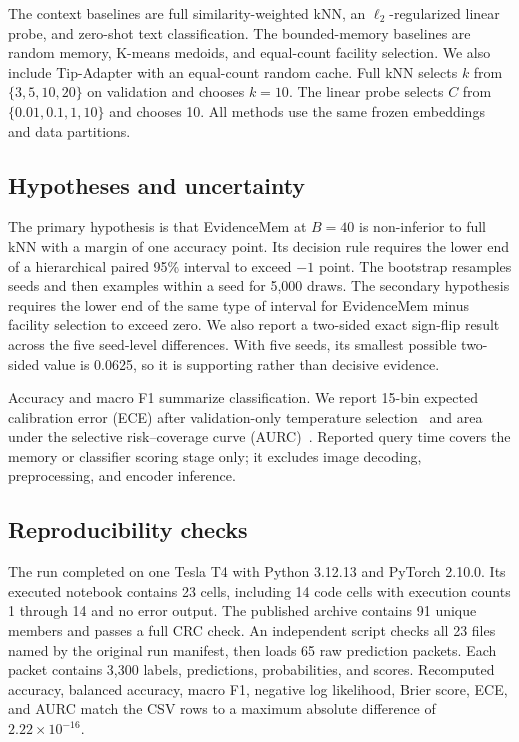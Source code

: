 \documentclass[10pt,twocolumn]{article}
\newcommand{\method}{EvidenceMem}
\begin{document}
The context baselines are full similarity-weighted kNN, an $\ell_2$-regularized linear
probe, and zero-shot text classification. The bounded-memory baselines are random
memory, K-means medoids, and equal-count facility selection. We also include Tip-Adapter
with an equal-count random cache. Full kNN selects $k$ from $\{3,5,10,20\}$ on validation
and chooses $k=10$. The linear probe selects $C$ from $\{0.01,0.1,1,10\}$ and chooses
10. All methods use the same frozen embeddings and data partitions.

\subsection{Hypotheses and uncertainty}

The primary hypothesis is that \method{} at $B=40$ is non-inferior to full kNN with a
margin of one accuracy point. Its decision rule requires the lower end of a hierarchical
paired 95\% interval to exceed $-1$ point. The bootstrap resamples seeds and then examples
within a seed for 5,000 draws. The secondary hypothesis requires the lower end of the
same type of interval for \method{} minus facility selection to exceed zero. We also
report a two-sided exact sign-flip result across the five seed-level differences. With
five seeds, its smallest possible two-sided value is 0.0625, so it is supporting rather
than decisive evidence.

Accuracy and macro F1 summarize classification. We report 15-bin expected calibration
error (ECE) after validation-only temperature selection~\cite{guo2017calibration} and
area under the selective risk--coverage curve (AURC)~\cite{geifman2017selective}.
Reported query time covers the memory or classifier scoring stage only; it excludes
image decoding, preprocessing, and encoder inference.

\subsection{Reproducibility checks}

The run completed on one Tesla T4 with Python 3.12.13 and PyTorch 2.10.0. Its executed
notebook contains 23 cells, including 14 code cells with execution counts 1 through 14
and no error output. The published archive contains 91 unique members and passes a full
CRC check. An independent script checks all 23 files named by the original run manifest,
then loads 65 raw prediction packets. Each packet contains 3,300 labels, predictions,
probabilities, and scores. Recomputed accuracy, balanced accuracy, macro F1, negative
log likelihood, Brier score, ECE, and AURC match the CSV rows to a maximum absolute
difference of $2.22\times10^{-16}$.
\end{document}

